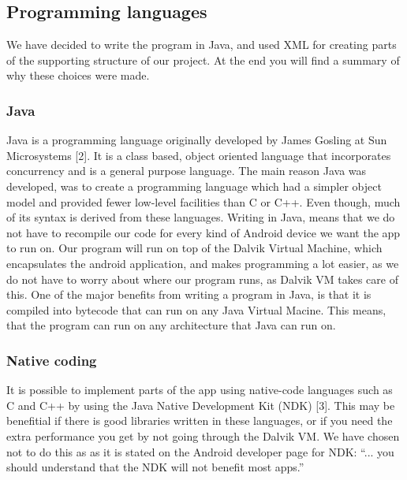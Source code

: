 

\subsection{Programming languages}

We have decided to write the program in Java, and used XML for creating parts of the supporting structure of our project. At the end you will find a summary of why these choices were made.

\subsubsection{Java}
Java is a programming language originally developed by James Gosling at Sun Microsystems [2]. It is a class based, object oriented language that incorporates concurrency and is a general purpose language. The main reason Java was developed, was to create a programming language which had a simpler object model and provided fewer low-level facilities than C or C++. Even though, much of its syntax is derived from these languages.
\newline
\newline
Writing in Java, means that we do not have to recompile our code for every kind of Android device we want the app to run on. Our program will run on top of the Dalvik Virtual Machine, which encapsulates the android application, and makes programming a lot easier, as we do not have to worry about where our program runs, as Dalvik VM takes care of this.
\newline
\newline
One of the major benefits from writing a program in Java, is that it is compiled into bytecode that can run on any Java Virtual Macine. This means, that the program can run on any architecture that Java can run on.

\subsubsection{Native coding}
It is possible to implement parts of the app using native-code languages such as C and C++ by using the Java Native Development Kit (NDK) [3]. This may be benefitial if there is good libraries written in these languages, or if you need the extra performance you get by not going through the Dalvik VM. We have chosen not to do this as as it is stated on the Android developer page for NDK: “... you should understand that the NDK will not benefit most apps.”

